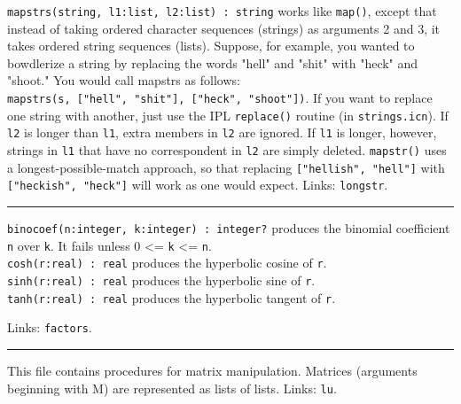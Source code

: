 \texttt{mapstrs(string, l1:list, l2:list) : string} works like
\texttt{map()}, except that instead of taking ordered character
sequences (strings) as arguments 2 and 3, it takes ordered string
sequences (lists). Suppose, for example, you wanted to
bowdlerize a string by replacing the words
"hell" and
"shit" with
"heck" and
"shoot." You would call mapstrs as
follows:\\
\texttt{mapstrs(s, ["hell",
"shit"],
["heck",
"shoot"])}. If you want to replace one
string with another, just use the IPL \texttt{replace()} routine (in
\texttt{strings.icn}). If \texttt{l2} is longer than \texttt{l1}, extra
members in \texttt{l2} are ignored. If \texttt{l1} is longer, however,
strings in \texttt{l1} that have no correspondent in \texttt{l2} are
simply deleted. \texttt{mapstr()} uses a longest-possible-match
approach, so that replacing
\texttt{["hellish",
"hell"]} with
\texttt{["heckish",
"heck"]} will work as one would expect.
Links: \texttt{longstr}.

\vspace{0.25cm}\hrule{}

\texttt{binocoef(n:integer, k:integer) : integer?} produces the
binomial coefficient \texttt{n} over
\texttt{k}. It fails unless 0 {\textless}= \texttt{k} {\textless}=
\texttt{n}.\\
\texttt{cosh(r:real) : real} produces the hyperbolic cosine of \texttt{r}.\\
\texttt{sinh(r:real) : real} produces the hyperbolic sine of
\texttt{r}.\\
\texttt{tanh(r:real) : real} produces the hyperbolic tangent of
\texttt{r}.

Links: \texttt{factors}.

\vspace{0.25cm}\hrule{}

This file contains procedures for matrix
manipulation. Matrices (arguments beginning with M) are represented as
lists of lists. Links: \texttt{lu}.

